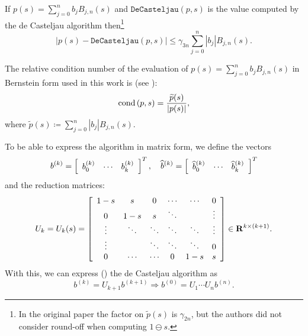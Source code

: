 \begin{theorem}
If \(p(s) = \sum_{j = 0}^n b_j B_{j, n}(s)\) and \(\mathtt{DeCasteljau}(p, s)\)
is the value computed by the de Casteljau algorithm then\footnote{In the
original paper the factor on \(\widetilde{p}(s)\) is \(\gamma_{2n}\),
but the authors did not consider round-off when computing
\(1 \ominus s\).}
\begin{equation}
\left|p(s) - \mathtt{DeCasteljau}(p, s)\right| \leq \gamma_{3n}
\sum_{j = 0}^n \left|b_j\right| B_{j, n}(s).
\end{equation}
\end{theorem}

The relative condition number of the evaluation of \(p(s) = \sum_{j = 0}^n
b_j B_{j, n}(s)\) in Bernstein form used in this work is (see
\cite{Mainar1999, Farouki1987}):
\begin{equation}
\operatorname{cond}\left(p, s\right) = \frac{\widetilde{p}(s)}{\left|p(s)\right|},
\end{equation}
where
\(\widetilde{p}(s) \coloneqq \sum_{j = 0}^n \left|b_j\right| B_{j, n}(s)\).

To be able to express the algorithm in matrix form, we define
the vectors
\begin{equation}
b^{(k)} = \left[\begin{array}{c c c} b_0^{(k)} & \cdots &
b_k^{(k)}\end{array}\right]^T, \quad
\widehat{b}^{(k)} = \left[\begin{array}{c c c} \widehat{b}_0^{(k)} & \cdots &
    \widehat{b}_k^{(k)}\end{array}\right]^T
\end{equation}
and the reduction matrices:
\begin{equation}
U_k = U_k(s) = \left[\begin{array}{c c c c c c}
    1 - s  & s      & 0      & \cdots & \cdots & 0      \\
    0      & 1 - s  & s      & \ddots &        & \vdots \\
    \vdots & \ddots & \ddots & \ddots & \ddots & \vdots \\
    \vdots &        & \ddots & \ddots & \ddots & 0 \\
    0      & \cdots & \cdots & 0      & 1 - s  & s
\end{array}\right] \in \mathbf{R}^{k \times (k + 1)}.
\end{equation}
With this, we can express (\cite{Mainar1999}) the de Casteljau algorithm as
\begin{equation}\label{eq:matrix-de-casteljau}
b^{(k)} = U_{k + 1} b^{(k + 1)}
\Longrightarrow b^{(0)} = U_1 \cdots U_n b^{(n)}.
\end{equation}

